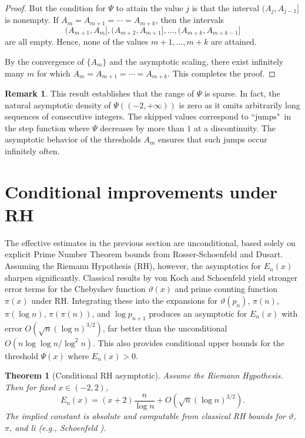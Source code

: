 \documentclass[10pt]{amsart}
\newtheorem{theorem}{Theorem}[section]
\theoremstyle{definition} %
\newtheorem{remark}{Remark}[section]
\numberwithin{equation}{section}
\begin{document}
\begin{proof}
But the condition for $\Psi$ to attain the value $j$ is that the interval $(A_{j}, A_{j-1}]$ is nonempty. If $A_m = A_{m+1} = \cdots = A_{m+k}$, then the intervals 
\[
(A_{m+1}, A_m], (A_{m+2}, A_{m+1}], \dots, (A_{m+k}, A_{m+k-1}]
\]
are all empty. Hence, none of the values $m+1, \dots, m+k$ are attained.

By the convergence of $\{A_m\}$ and the asymptotic scaling, there exist infinitely many $m$ for which $A_m = A_{m+1} = \cdots = A_{m+k}$. This completes the proof.
\end{proof}

\begin{remark}
This result establishes that the range of $\Psi$ is sparse. In fact, the natural asymptotic density of $\Psi((-2,+\infty))$ is zero as it omits arbitrarily long sequences of consecutive integers. The skipped values correspond to ``jumps"\ in the step function where $\Psi$ decreases by more than $1$ at a discontinuity. The asymptotic behavior of the thresholds $A_m$ ensures that such jumps occur infinitely often.
\end{remark}


\section{Conditional improvements under RH}\label{RH}

The effective estimates in the previous section are unconditional, based solely on explicit Prime Number Theorem bounds from Rosser-Schoenfeld and Dusart. Assuming the Riemann Hypothesis (RH), however, the asymptotics for \(E_n(x)\) sharpen significantly. Classical results by von Koch \cite{Koch} and Schoenfeld \cite{schoRH} yield stronger error terms for the Chebyshev function \(\vartheta(x)\) and prime counting function \(\pi(x)\) under RH. Integrating these into the expansions for \(\vartheta(p_n)\), \(\pi(n)\), \(\pi(\log n)\), \(\pi(\pi(n))\), and \(\log p_{n+1}\) produces an asymptotic for \(E_n(x)\) with error \(O(\sqrt{n} (\log n)^{3/2})\), far better than the unconditional \(O(n \log \log n / \log^2 n)\). This also provides conditional upper bounds for the threshold \(\Psi(x)\) where \(E_n(x) > 0\).

\begin{theorem}[Conditional RH asymptotic]
Assume the Riemann Hypothesis. Then for fixed \(x \in (-2,2)\), 
\[
E_n(x) = (x+2) \frac{n}{\log n} + O(\sqrt{n} (\log n)^{3/2}).
\]
The implied constant is absolute and computable from classical RH bounds for \(\vartheta\), \(\pi\), and \emph{li} (e.g., Schoenfeld \cite{schoRH}).
\end{theorem}
\end{document}
